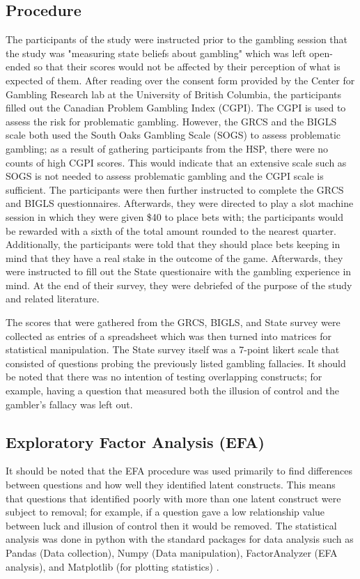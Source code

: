 \documentclass[twoside,twocolumn]{article}
\begin{document}
\subsection{Procedure}
The participants of the study were instructed prior to the gambling session that the study was "measuring state beliefs about gambling" which was left open-ended so that their scores would not be affected by their perception of what is expected of them. After reading over the consent form provided by the Center for Gambling Research lab at the University of British Columbia, the participants filled out the Canadian Problem Gambling Index (CGPI). The CGPI is used to assess the risk for problematic gambling\cite{wynne:2003}. However, the GRCS and the BIGLS scale both used the South Oaks Gambling Scale (SOGS) to assess problematic gambling; as a result of gathering participants from the HSP, there were no counts of high CGPI scores\cite{darke:1997, raylu:2004}. This would indicate that an extensive scale such as SOGS is not needed to assess problematic gambling and the CGPI scale is sufficient. The participants were then further instructed to complete the GRCS and BIGLS questionnaires. Afterwards, they were directed to play a slot machine session in which they were given \$40 to place bets with; the participants would be rewarded with a sixth of the total amount rounded to the nearest quarter. Additionally, the participants were told that they should place bets keeping in mind that they have a real stake in the outcome of the game. Afterwards, they were instructed to fill out the State questionaire with the gambling experience in mind. At the end of their survey, they were debriefed of the purpose of the study and related literature.

The scores that were gathered from the GRCS, BIGLS, and State survey were collected as entries of a spreadsheet which was then turned into matrices for statistical manipulation. The State survey itself was a 7-point likert scale that consisted of questions probing the previously listed gambling fallacies. It should be noted that there was no intention of testing overlapping constructs; for example, having a question that measured both the  illusion of control and the gambler's fallacy was left out.
\subsection{Exploratory Factor Analysis (EFA)}
It should be noted that the EFA procedure was used primarily to find differences between questions and how well they identified latent constructs. This means that questions that identified poorly with more than one latent construct were subject to removal; for example, if a question gave a low relationship value between luck and illusion of control then it would be removed. The statistical analysis was done in python with the standard packages for data analysis such as Pandas (Data collection), Numpy (Data manipulation), FactorAnalyzer (EFA analysis), and Matplotlib (for plotting statistics) \cite{factoranalyzer}.
\end{document}
